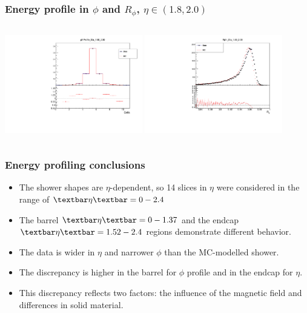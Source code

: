 \documentclass{beamer}
\begin{document}
\begin{frame}
\frametitle{Energy profile in $\phi$ and $R_\phi$,  $\eta \in (1.8, 2.0)$}

\begin{columns}[t]
\centering
\includegraphics[width=6cm]{phiProfile2_Eta_18_20.pdf}
\centering
\includegraphics[width=6cm]{Rphi2_Eta_18_20.pdf}
\end{columns}
\end{frame}


\begin{frame}
\frametitle{Energy profiling conclusions}
\begin{itemize}
\item The shower shapes are $\eta$-dependent, so 14 slices in $\eta$ were considered in the range of  $\textbar \eta\textbar = 0 - 2.4$
\item The barrel $\textbar \eta\textbar = 0 - 1.37$ and the endcap $\textbar \eta\textbar = 1.52 - 2.4$ regions demonstrate different behavior.
\item The data is wider in $\eta$ and narrower $\phi$ than the MC-modelled shower.
\item The discrepancy is higher in the barrel for $\phi$ profile and in the endcap for $\eta$.
\item This discrepancy reflects two factors: the influence of the magnetic field and  differences in solid material. 
\end{itemize}
\end{frame}
\end{document}
